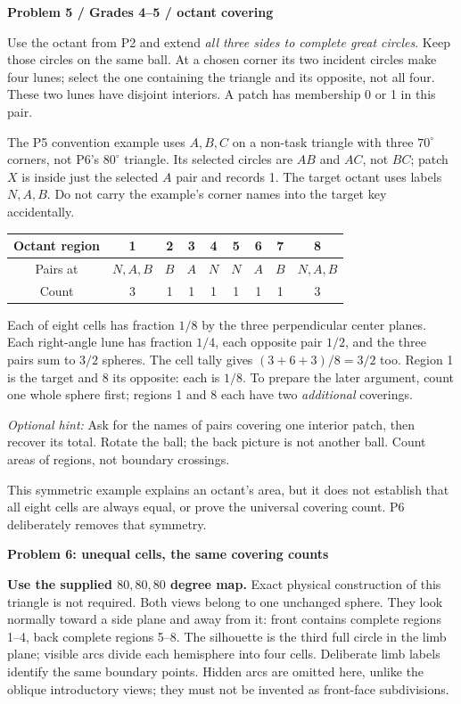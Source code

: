 \documentclass[11pt,letterpaper]{article}
\newcommand{\topic}[1]{\par{\large\bfseries\color{blue}#1}\par}
\newcommand{\sub}[1]{\par\textbf{#1}\par}
\newcommand{\hint}[1]{\textit{Optional hint:} #1\par}
\newcommand{\degc}{^\circ}
\begin{document}
\sub{Problem 5 / Grades 4--5 / octant covering}
Use the octant from P2 and extend \emph{all three sides to complete great circles}. Keep those circles on the same ball. At a chosen corner its two incident circles make four lunes; select the one containing the triangle and its opposite, not all four. These two lunes have disjoint interiors. A patch has membership 0 or 1 in this pair.

The P5 convention example uses $A,B,C$ on a non-task triangle with three $70\degc$ corners, not P6's $80\degc$ triangle. Its selected circles are $AB$ and $AC$, not $BC$; patch $X$ is inside just the selected $A$ pair and records 1. The target octant uses labels $N,A,B$. Do not carry the example's corner names into the target key accidentally.

\begin{center}\begin{tabular}{c|cccccccc}
Octant region & 1&2&3&4&5&6&7&8\\\hline
Pairs at & $N,A,B$&$B$&$A$&$N$&$N$&$A$&$B$&$N,A,B$\\
Count &3&1&1&1&1&1&1&3
\end{tabular}\end{center}
Each of eight cells has fraction $1/8$ by the three perpendicular center planes. Each right-angle lune has fraction $1/4$, each opposite pair $1/2$, and the three pairs sum to $3/2$ spheres. The cell tally gives $(3+6+3)/8=3/2$ too. Region 1 is the target and 8 its opposite: each is $1/8$. To prepare the later argument, count one whole sphere first; regions 1 and 8 each have two \emph{additional} coverings.

\hint{Ask for the names of pairs covering one interior patch, then recover its total. Rotate the ball; the back picture is not another ball. Count areas of regions, not boundary crossings.}
This symmetric example explains an octant's area, but it does not establish that all eight cells are always equal, or prove the universal covering count. P6 deliberately removes that symmetry.

\newpage
\topic{Problem 6: unequal cells, the same covering counts}
\textbf{Use the supplied $80,80,80$ degree map.} Exact physical construction of this triangle is not required. Both views belong to one unchanged sphere. They look normally toward a side plane and away from it: front contains complete regions 1--4, back complete regions 5--8. The silhouette is the third full circle in the limb plane; visible arcs divide each hemisphere into four cells. Deliberate limb labels identify the same boundary points. Hidden arcs are omitted here, unlike the oblique introductory views; they must not be invented as front-face subdivisions.
\end{document}
